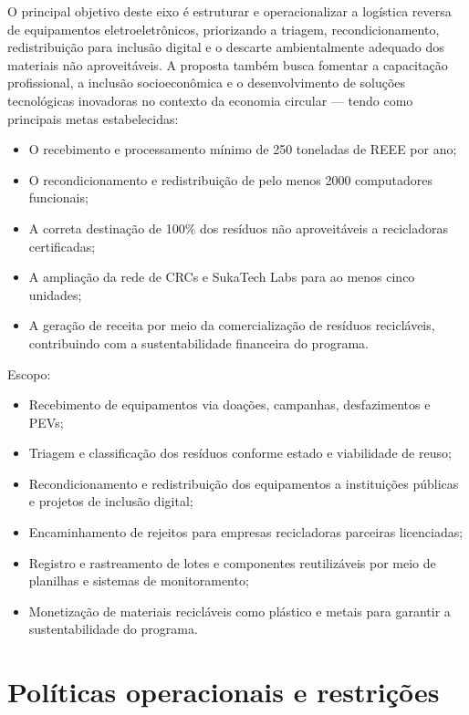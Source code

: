 \documentclass[
	12pt,				%
	openright,			%
	twoside,			%
	a4paper,			%
	english,			%
	french,				%
	spanish,			%
	brazil,				%
	]{abntex2}
\begin{document}
O principal objetivo deste eixo é estruturar e operacionalizar a logística reversa de equipamentos eletroeletrônicos, priorizando a triagem, recondicionamento, redistribuição para inclusão digital e o descarte ambientalmente adequado dos materiais não aproveitáveis. A proposta também busca fomentar a capacitação profissional, a inclusão socioeconômica e o desenvolvimento de soluções tecnológicas inovadoras no contexto da economia circular — tendo como principais metas estabelecidas:

\begin{itemize}
  \item O recebimento e processamento mínimo de 250 toneladas de REEE por ano;
  \item O recondicionamento e redistribuição de pelo menos 2000 computadores funcionais;
  \item A correta destinação de 100\% dos resíduos não aproveitáveis a recicladoras certificadas;
  \item A ampliação da rede de CRCs e SukaTech Labs para ao menos cinco unidades;
  \item A geração de receita por meio da comercialização de resíduos recicláveis, contribuindo com a sustentabilidade financeira do programa.
\end{itemize}

Escopo:

\begin{itemize}
  \item Recebimento de equipamentos via doações, campanhas, desfazimentos e PEVs;
  \item Triagem e classificação dos resíduos conforme estado e viabilidade de reuso;
  \item Recondicionamento e redistribuição dos equipamentos a instituições públicas e projetos de inclusão digital;
  \item Encaminhamento de rejeitos para empresas recicladoras parceiras licenciadas;
  \item Registro e rastreamento de lotes e componentes reutilizáveis por meio de planilhas e sistemas de monitoramento;
  \item Monetização de materiais recicláveis como plástico e metais para garantir a sustentabilidade do programa.
\end{itemize}

\section{Políticas operacionais e restrições}
\end{document}
